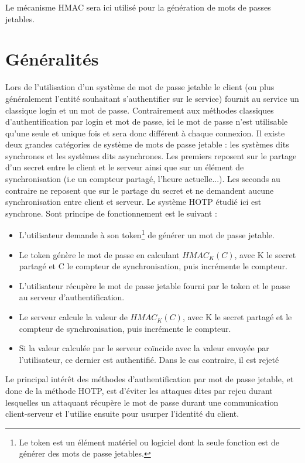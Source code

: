 \documentclass{../res/univ-projet}
\begin{document}
Le mécanisme HMAC sera ici utilisé pour la génération de mots de passes jetables.

\section{Généralités}
Lors de l'utilisation d'un système de mot de passe jetable le client (ou plus généralement l'entité souhaitant s'authentifier sur le service) fournit au service un 
classique login et un mot de passe. Contrairement aux méthodes classiques d'authentification par login et mot de passe, ici le mot de passe n'est utilisable qu'une seule et 
unique fois et sera donc différent à chaque connexion.
Il existe deux grandes catégories de système de mots de passe jetable : les systèmes dits \og{}synchrones\fg{} et les systèmes dits \og{}asynchrones\fg{}. Les premiers 
reposent sur le partage d'un secret entre le client et le serveur ainsi que sur un élément de synchronisation (i.e un compteur partagé, l'heure actuelle...). Les seconds 
au contraire ne reposent que sur le partage du secret et ne demandent aucune synchronisation entre client et serveur.
Le système \og{}HOTP\fg{} étudié ici est synchrone. Sont principe de fonctionnement est le suivant :
\begin{itemize}
 \item L'utilisateur demande à son token\footnote{Le token est un élément matériel ou logiciel dont la seule fonction est de générer des mots de passe jetables.} de 
 générer un mot de passe jetable.
 \item Le token génère le mot de passe en calculant $HMAC_K(C)$, avec K le secret partagé et C le compteur de synchronisation, puis incrémente le compteur.
 \item L'utilisateur récupère le mot de passe jetable fourni par le token et le passe au serveur d'authentification.
 \item Le serveur calcule la valeur de $HMAC_K(C)$, avec K le secret partagé et le compteur de synchronisation, puis incrémente le compteur.
 \item Si la valeur calculée par le serveur coïncide avec la valeur envoyée par l'utilisateur, ce dernier est authentifié. Dans le cas contraire, il est rejeté
\end{itemize}

Le principal intérêt des méthodes d'authentification par mot de passe jetable, et donc de la méthode HOTP, est d'éviter les attaques dites \og{}par rejeu\fg{} durant 
lesquelles un attaquant récupère le mot de passe durant une communication client-serveur et l'utilise ensuite pour usurper l'identité du client.
\end{document}
